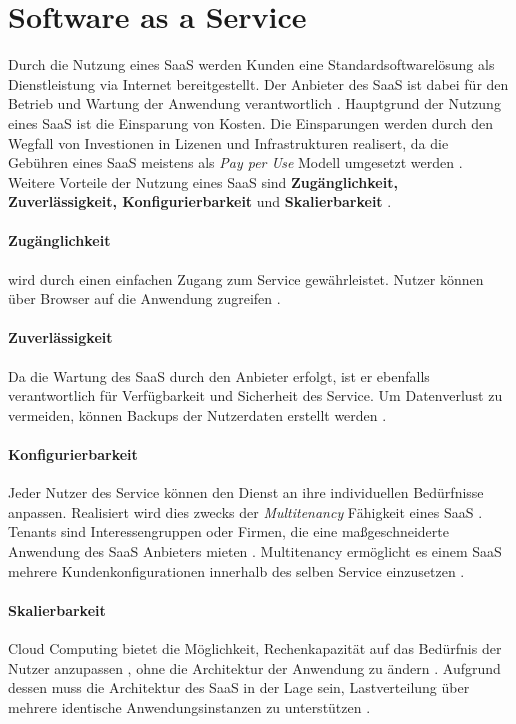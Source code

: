 \section{Software as a Service}
\label{sec:grundlagen:saas}
Durch die Nutzung eines \acf{SaaS} werden Kunden eine Standardsoftwarelösung als Dienstleistung via Internet bereitgestellt.
Der Anbieter des \ac{SaaS} ist dabei für den Betrieb und Wartung der Anwendung verantwortlich \cite{Buxmann2008}.
Hauptgrund der Nutzung eines \ac{SaaS} ist die Einsparung von Kosten.
Die Einsparungen werden durch den Wegfall von Investionen in Lizenen und Infrastrukturen realisert,
da die Gebühren eines \ac{SaaS} meistens als \emph{Pay per Use} Modell umgesetzt werden \cite{Tan2013}.
Weitere Vorteile der Nutzung eines \ac{SaaS} sind \textbf{Zugänglichkeit, Zuverlässigkeit, Konfigurierbarkeit} und \textbf{Skalierbarkeit} \cite{Tan2013}.
\paragraph{Zugänglichkeit}
wird durch einen einfachen Zugang zum Service gewährleistet. Nutzer können über Browser auf die Anwendung zugreifen \cite{Tan2013}.

\paragraph{Zuverlässigkeit}
Da die Wartung des \ac{SaaS} durch den Anbieter erfolgt, ist er ebenfalls verantwortlich für Verfügbarkeit und Sicherheit des Service.
Um Datenverlust zu vermeiden, können Backups der Nutzerdaten erstellt werden \cite{Tan2013}.

\paragraph{Konfigurierbarkeit}
Jeder Nutzer des Service können den Dienst an ihre individuellen Bedürfnisse anpassen.
Realisiert wird dies zwecks der \emph{Multitenancy} Fähigkeit eines \ac{SaaS} \cite{Tan2013}.
Tenants sind Interessengruppen oder Firmen, die eine maßgeschneiderte Anwendung des \ac{SaaS} Anbieters mieten \cite{Schroeter2012}.
Multitenancy ermöglicht es einem \ac{SaaS} mehrere Kundenkonfigurationen innerhalb des selben Service einzusetzen \cite{Tan2013}.

\paragraph{Skalierbarkeit}
Cloud Computing bietet die Möglichkeit, Rechenkapazität auf das Bedürfnis der Nutzer anzupassen \cite{Tan2013},
ohne die Architektur der Anwendung zu ändern \cite{Satyanarayana2012}.
Aufgrund dessen muss die Architektur des \ac{SaaS} in der Lage sein, Lastverteilung über mehrere identische Anwendungsinstanzen
zu unterstützen \cite{Satyanarayana2012}.